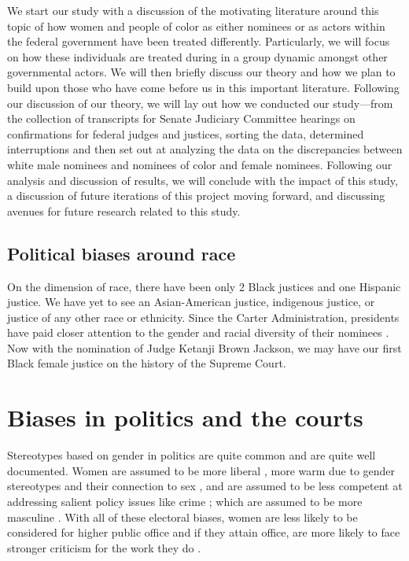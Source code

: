 \documentclass [12pt]{article}
\begin{document}
We start our study with a discussion of the motivating literature around this topic of how women and people of color as either nominees or as actors within the federal government have been treated differently. Particularly, we will focus on how these individuals are treated during in a group dynamic amongst other governmental actors. We will then briefly discuss our theory and how we plan to build upon those who have come before us in this important literature. Following our discussion of our theory, we will lay out how we conducted our study—from the collection of transcripts for Senate Judiciary Committee hearings on confirmations for federal judges and justices, sorting the data, determined interruptions and then set out at analyzing the data on the discrepancies between white male nominees and nominees of color and female nominees. Following our analysis and discussion of results, we will conclude with the impact of this study, a discussion of future iterations of this project moving forward, and discussing avenues for future research related to this study. 

	\subsection{Political biases around race}
On the dimension of race, there have been only 2 Black justices and one Hispanic justice. We have yet to see an Asian-American justice, indigenous justice, or justice of any other race or ethnicity. Since the Carter Administration, presidents have paid closer attention to the gender and racial diversity of their nominees \citep{kastellec_2013}. Now with the nomination of Judge Ketanji Brown Jackson, we may have our first Black female justice on the history of the Supreme Court. 

\section{Biases in politics and the courts}

Stereotypes based on gender in politics are quite common and are quite well documented. Women are assumed to be more liberal \citep{mcdermott_1997_ajps}, more warm due to gender stereotypes and their connection to sex \citep{laustsen_bor_2017}, and are assumed to be less competent at addressing salient policy issues like crime \citep{huddy_terkildsen_1993, sanbonmatsu_dolan_2009}; which are assumed to be more masculine \citep{holman_et-al_2016}. With all of these electoral biases, women are less likely to be considered for higher public office \citep{oliver_conroy_2020} and if they attain office, are more likely to face stronger criticism for the work they do \citep{lazarus_steigerwalt_2018}.
\end{document}
